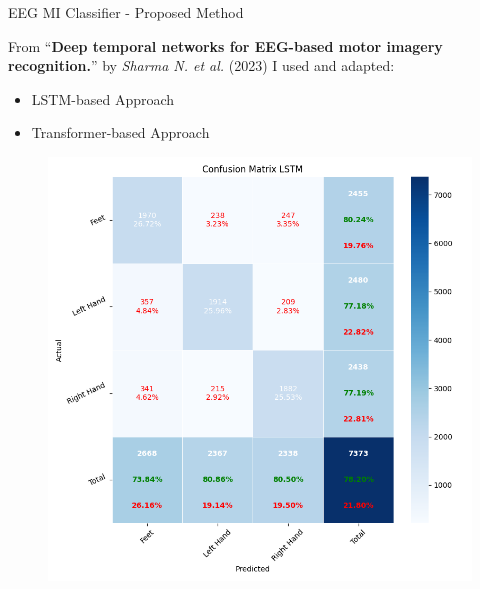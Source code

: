 \begin{frame}{EEG MI Classifier - Proposed Method}
    \begin{minipage}[c]{.65\textwidth}
        From ``\textbf{Deep temporal networks for EEG-based motor imagery recognition.}'' by \textit{Sharma N. et al.} (2023) I used and adapted: 
        \begin{itemize}
            \item LSTM-based Approach
            \item Transformer-based Approach
        \end{itemize}
    \end{minipage}
    \begin{minipage}[c]{.33\textwidth}
        \begin{figure}[htpb!]
            \centering
            \includegraphics[width=\textwidth]{figures/classification/confusion_matrix_lstm}

\end{figure}
\end{minipage}
\end{frame}

